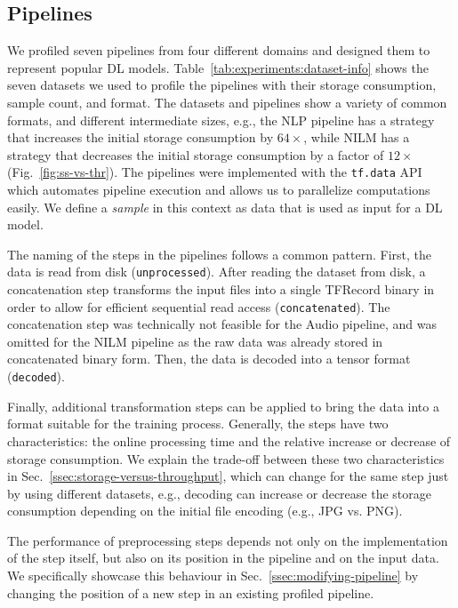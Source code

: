 \vspace{-0.2cm}
\subsection{Pipelines}

We profiled {\color{diff}seven} pipelines from four different domains and designed them to represent popular DL models.
Table~\ref{tab:experiments:dataset-info} shows the seven datasets we used to profile the pipelines with their storage consumption, sample count, and format.
The datasets and pipelines show a variety of common formats, and different intermediate sizes, e.g., the NLP pipeline has a strategy that increases the initial storage consumption by $64\times$, while NILM has a strategy that decreases the initial storage consumption by a factor of $12\times$ (Fig.~\ref{fig:ss-vs-thr}).
The pipelines were implemented with the \texttt{tf.data} API~\cite{murray2021tf} which automates pipeline execution and allows us to parallelize computations easily.
We define a \textit{sample} in this context as data that is used as input for a DL model.

{\color{diff}The naming of the steps in the pipelines follows a common pattern.
First, the data is read from disk (\texttt{unprocessed}).
After reading the dataset from disk, a concatenation step transforms the input files into a single TFRecord binary in order to allow for efficient sequential read access (\texttt{concatenated}).
The concatenation step was technically not feasible for the Audio pipeline, and was omitted for the NILM pipeline as the raw data was already stored in concatenated binary form.
Then, the data is decoded into a tensor format (\texttt{decoded}).
}
{\color{diff3}
Finally, additional transformation steps can be applied to bring the data into a format suitable for the training process.
Generally, the steps have two characteristics: the online processing time and the relative increase or decrease of storage consumption.
We explain the trade-off between these two characteristics in Sec.~\ref{ssec:storage-versus-throughput}, which can change for the same step just by using different datasets, e.g., decoding can increase or decrease the storage consumption depending on the initial file encoding (e.g., JPG vs. PNG).

The performance of preprocessing steps depends not only on the implementation of the step itself, but also on its position in the pipeline and on the input data. We specifically showcase this behaviour in Sec.~\ref{ssec:modifying-pipeline} by changing the position of a new step in an existing profiled pipeline.
}

